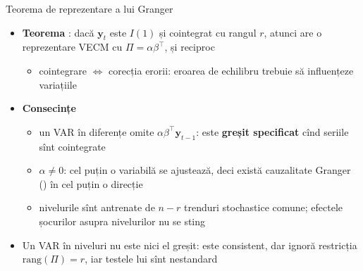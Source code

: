 \begin{frame}{Teorema de reprezentare a lui Granger}
\itemsize{\small}
\begin{itemize}
    \item \textbf{Teorema} : dacă $\mathbf y_t$ este $I(1)$ și cointegrat cu rangul $r$, atunci are o reprezentare VECM cu $\Pi = \alpha\beta^\top$, și reciproc
    \begin{itemize}
        \item cointegrare $\Leftrightarrow$ corecția erorii: eroarea de echilibru trebuie să influențeze variațiile
    \end{itemize}
    \item \textbf{Consecințe}
    \begin{itemize}
        \item un VAR în diferențe omite $\alpha\beta^\top\mathbf y_{t-1}$: este \textbf{greșit specificat} cînd seriile sînt cointegrate
        \item $\alpha \neq 0$: cel puțin o variabilă se ajustează, deci există cauzalitate Granger () în cel puțin o direcție
        \item nivelurile sînt antrenate de $n - r$ trenduri stochastice comune; efectele șocurilor asupra nivelurilor nu se sting
    \end{itemize}
    \item Un VAR în niveluri nu este nici el greșit: este consistent, dar ignoră restricția $\mathrm{rang}(\Pi) = r$, iar testele lui sînt nestandard
\end{itemize}
\end{frame}

